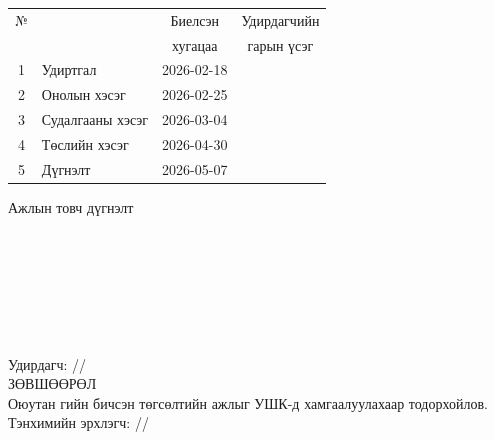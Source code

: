 \begin{titlepage}
\begin{center}
\begin{tabular}{|c|p{7cm}|c|c|}
	\hline
	№ & \makebox[7cm][c]{Хийж гүйцэтгэсэн ажил} & Биелсэн     & Удирдагчийн \\
	  &                    & хугацаа    & гарын үсэг \\ \hline
	1 & {Удиртгал} & 2026-02-18 &  \\ \hline
	2 & {Онолын хэсэг} & 2026-02-25 &  \\ \hline
	3 & {Судалгааны хэсэг} & 2026-03-04 &  \\ \hline
	4 & {Төслийн хэсэг} & 2026-04-30 &  \\ \hline
	5 & {Дүгнэлт} & 2026-05-07 &  \\ \hline
\end{tabular}

\vspace{1cm}
Ажлын товч дүгнэлт \\[0.5cm]
\dotfill \\[0.2cm]
\dotfill \\[0.2cm]
\dotfill \\[0.2cm]
\dotfill \\[0.2cm]
\dotfill \\[0.2cm]
\dotfill \\[0.2cm]
\dotfill \\[0.5cm]
Удирдагч: \makebox[3cm]{\dotfill} /\supname/ \\

\vspace{2cm}
ЗӨВШӨӨРӨЛ \\[0.5cm]
Оюутан \shortname{}гийн бичсэн төгсөлтийн ажлыг УШК-д хамгаалуулахаар тодорхойлов.\\[0.5cm]
Тэнхимийн эрхлэгч: \makebox[3cm]{\dotfill} /\chairname/
\end{center}

\end{titlepage}

\newpage

